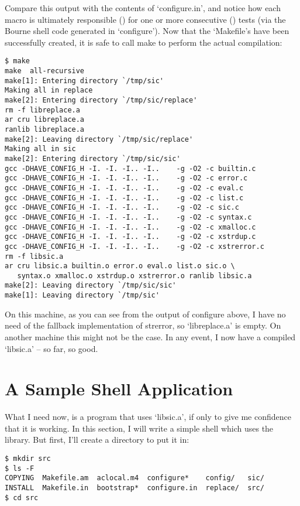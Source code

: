 Compare this output with the contents of `configure.in', and notice how each 
macro is ultimately responsible ({\McQ{}}) for one or more 
consecutive ({\McQ{}}) tests (via the Bourne shell code generated 
in `configure'). Now that the `Makefile's have been successfully created,
it is safe to call make to perform the actual compilation: 

\begin{Verbatim}[frame=single]
$ make
make  all-recursive
make[1]: Entering directory `/tmp/sic'
Making all in replace
make[2]: Entering directory `/tmp/sic/replace'
rm -f libreplace.a
ar cru libreplace.a
ranlib libreplace.a
make[2]: Leaving directory `/tmp/sic/replace'
Making all in sic
make[2]: Entering directory `/tmp/sic/sic'
gcc -DHAVE_CONFIG_H -I. -I. -I.. -I..    -g -O2 -c builtin.c
gcc -DHAVE_CONFIG_H -I. -I. -I.. -I..    -g -O2 -c error.c
gcc -DHAVE_CONFIG_H -I. -I. -I.. -I..    -g -O2 -c eval.c
gcc -DHAVE_CONFIG_H -I. -I. -I.. -I..    -g -O2 -c list.c
gcc -DHAVE_CONFIG_H -I. -I. -I.. -I..    -g -O2 -c sic.c
gcc -DHAVE_CONFIG_H -I. -I. -I.. -I..    -g -O2 -c syntax.c
gcc -DHAVE_CONFIG_H -I. -I. -I.. -I..    -g -O2 -c xmalloc.c
gcc -DHAVE_CONFIG_H -I. -I. -I.. -I..    -g -O2 -c xstrdup.c
gcc -DHAVE_CONFIG_H -I. -I. -I.. -I..    -g -O2 -c xstrerror.c
rm -f libsic.a
ar cru libsic.a builtin.o error.o eval.o list.o sic.o \
   syntax.o xmalloc.o xstrdup.o xstrerror.o ranlib libsic.a
make[2]: Leaving directory `/tmp/sic/sic'
make[1]: Leaving directory `/tmp/sic'
\end{Verbatim}

On this machine, as you can see from the output of configure above, I have 
no need of the fallback implementation of strerror, so `libreplace.a' is empty.
On another machine this might not be the case. In any event, I now have a 
compiled `libsic.a' -- so far, so good. 

\section{A Sample Shell Application}

What I need now, is a program that uses `libsic.a', if only to give me 
confidence that it is working. In this section, I will write a simple 
shell which uses the library. But first, I'll create a directory to put it in:

\begin{Verbatim}[frame=single]
$ mkdir src
$ ls -F
COPYING  Makefile.am  aclocal.m4  configure*    config/   sic/
INSTALL  Makefile.in  bootstrap*  configure.in  replace/  src/
$ cd src
\end{Verbatim}

